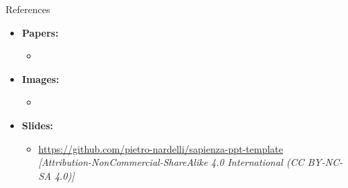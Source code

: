 \documentclass[t,aspectratio=169]{beamer}
\begin{document}
\begin{frame}{References}
  \begin{itemize}
    \item \textbf{Papers:}
      \begin{itemize}\item\end{itemize}
    \item \textbf{Images:}
      \begin{itemize}\item\end{itemize}
    \item \textbf{Slides:}
      \begin{itemize}
        \item \url{https://github.com/pietro-nardelli/sapienza-ppt-template}\\
          {\small\itshape [Attribution-NonCommercial-ShareAlike 4.0 International (CC BY-NC-SA 4.0)]}
      \end{itemize}
  \end{itemize}
\end{frame}

\begin{frame}[plain]
\end{frame}
\end{document}
